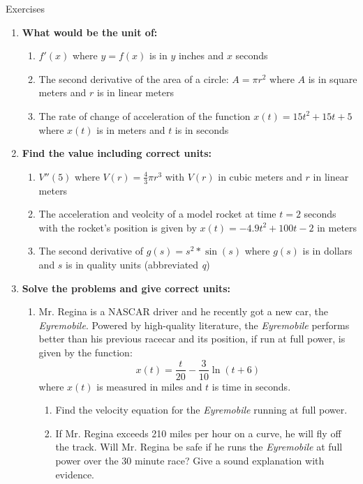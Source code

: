 \documentclass[../revisedmain.tex]{subfiles}
\begin{document}
	\begin{center}
		\Large{Exercises}
	\end{center}
	\begin{enumerate}
		\item \textbf{What would be the unit of:}
		\begin{enumerate}
			\item $f'(x)$ where $y=f(x)$ is in $y$ inches and $x$ seconds
			\item The second derivative of the area of a circle: $A=\pi r^2$ where $A$ is in square meters and $r$ is in linear meters
			\item The rate of change of acceleration of the function $x(t)=15t^2+15t+5$ where $x(t)$ is in meters and $t$ is in seconds
		\end{enumerate}
		\item \textbf{Find the value including correct units:}
		\begin{enumerate}
			\item $V''(5)$ where $V(r)=\frac{4}{3}\pi r^3$ with $V(r)$ in cubic meters and $r$ in linear meters
			\item The acceleration and veolcity of a model rocket at time $t=2$ seconds with the rocket's position is given by $x(t)=-4.9t^2+100t-2$ in meters
			\item The second derivative of $g(s)=s^2*\sin(s)$ where $g(s)$ is in dollars and $s$ is in quality units (abbreviated \textit{q})
		\end{enumerate}
		\item \textbf{Solve the problems and give correct units:}
		\begin{enumerate}
			\item Mr. Regina is a NASCAR driver and he recently got a new car, the \textit{Eyremobile}. Powered by high-quality literature, the \textit{Eyremobile} performs better than his previous racecar and its position, if run at full power, is given by the function: \[x(t)=\frac{t}{20}-\frac{3}{10}\ln(t+6)\] where $x(t)$ is measured in miles and $t$ is time in seconds.
			\begin{enumerate}
				\item Find the velocity equation for the \textit{Eyremobile} running at full power.
				\item If Mr. Regina exceeds 210 miles per hour on a curve, he will fly off the track. Will Mr. Regina be safe if he runs the \textit{Eyremobile} at full power over the 30 minute race? Give a sound explanation with evidence.
			\end{enumerate}
		\end{enumerate}
	\end{enumerate}
\end{document}
